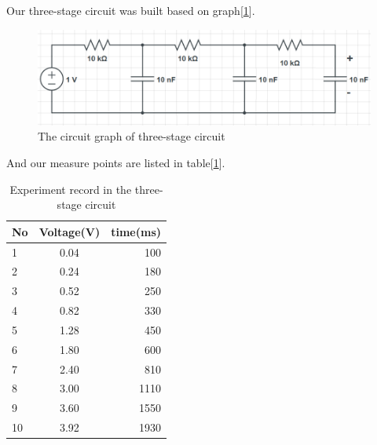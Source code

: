 \phantom{ } Our three-stage circuit was built based on graph[\ref{fig:2.4}].\\
\begin{figure}[!htbp]
	\centering %
	\begin{framed}
	\includegraphics[width=\linewidth]{images/2_4.PNG} %
	\caption{The circuit graph of three-stage circuit} %
\end{framed}
	\label{fig:2.4} %
\end{figure}
\phantom{ }And our measure points are listed in table[\ref{tab:eri}].\\
\begin{table}[!htbp]\centering
	\caption{Experiment record in the three-stage circuit}
	\renewcommand\arraystretch{1.5}
	\label{tab:eri}
	\begin{tabular}{lcr}
		\toprule
		No		&Voltage(V)	&time(ms)	\\
		\midrule
		1		&0.04		&100		\\
		
		2		&0.24		&180		\\
		
		3		&0.52		&250		\\
		
		4		&0.82		&330		\\
		
		5		&1.28		&450		\\
		
		6		&1.80		&600		\\
		
		7		&2.40		&810		\\
		
		8		&3.00		&1110		\\
		
		9		&3.60		&1550		\\
		
		10		&3.92		&1930		\\
		\bottomrule
	\end{tabular}
\end{table}
